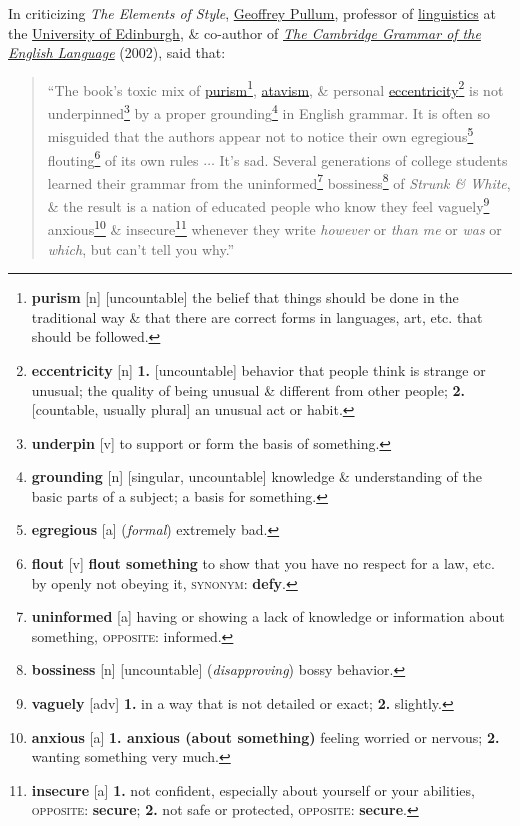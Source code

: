 \documentclass{article}
\begin{document}
In criticizing {\it The Elements of Style}, \href{https://en.wikipedia.org/wiki/Geoffrey_Pullum}{Geoffrey Pullum}, professor of \href{https://en.wikipedia.org/wiki/Linguistics}{linguistics} at the \href{https://en.wikipedia.org/wiki/University_of_Edinburgh}{University of Edinburgh}, \& co-author of \href{https://en.wikipedia.org/wiki/The_Cambridge_Grammar_of_the_English_Language}{{\it The Cambridge Grammar of the English Language}} (2002), said that:
\begin{quotation}
	``The book's toxic mix of \href{https://en.wikipedia.org/wiki/Linguistic_purism}{purism}\footnote{{\bf purism} [n] [uncountable] the belief that things should be done in the traditional way \& that there are correct forms in languages, art, etc. that should be followed.}, \href{https://en.wikipedia.org/wiki/Atavism}{atavism}, \& personal \href{https://en.wikipedia.org/wiki/Eccentricity_(behavior)}{eccentricity}\footnote{{\bf eccentricity} [n] {\bf 1.} [uncountable] behavior that people think is strange or unusual; the quality of being unusual \& different from other people; {\bf 2.} [countable, usually plural] an unusual act or habit.} is not underpinned\footnote{{\bf underpin} [v] to support or form the basis of something.} by a proper grounding\footnote{{\bf grounding} [n] [singular, uncountable] knowledge \& understanding of the basic parts of a subject; a basis for something.} in English grammar. It is often so misguided that the authors appear not to notice their own egregious\footnote{{\bf egregious} [a] ({\it formal}) extremely bad.} flouting\footnote{{\bf flout} [v] {\bf flout something} to show that you have no respect for a law, etc. by openly not obeying it, \textsc{synonym}: {\bf defy}.} of its own rules $\ldots$ It's sad. Several generations of college students learned their grammar from the uninformed\footnote{{\bf uninformed} [a] having or showing a lack of knowledge or information about something, \textsc{opposite}: informed.} bossiness\footnote{{\bf bossiness} [n] [uncountable] ({\it disapproving}) bossy behavior.} of {\it Strunk \& White}, \& the result is a nation of educated people who know they feel vaguely\footnote{{\bf vaguely} [adv] {\bf 1.} in a way that is not detailed or exact; {\bf 2.} slightly.} anxious\footnote{{\bf anxious} [a] {\bf 1. anxious (about something)} feeling worried or nervous; {\bf 2.} wanting something very much.} \& insecure\footnote{{\bf insecure} [a] {\bf 1.} not confident, especially about yourself or your abilities, \textsc{opposite}: {\bf secure}; {\bf 2.} not safe or protected, \textsc{opposite}: {\bf secure}.} whenever they write {\it however} or {\it than me} or {\it was} or {\it which}, but can't tell you why.''
\end{quotation}
\end{document}
